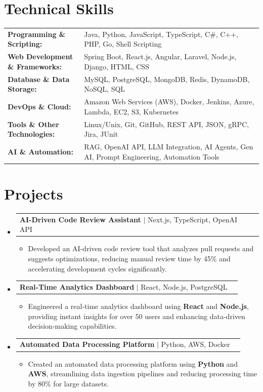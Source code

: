 \documentclass[letterpaper,10pt]{article}
\makeatletter
\newcommand{\resumeItem}[1]{
  \item{\fontsize{8pt}{9pt}\selectfont
    #1 \vspace{-3pt}
  }
}
\newcommand{\resumeProjectHeading}[2]{
    \item
    \begin{tabular*}{1.001\textwidth}{l@{\extracolsep{\fill}}r}
      \fontsize{8.5pt}{10pt}#1 & \textbf{\fontsize{8.5pt}{10pt} #2}\\
    \end{tabular*}\vspace{-7pt}
}
\newcommand{\resumeSubHeadingListStart}{\begin{itemize}[leftmargin=0pt, label={}]}
\newcommand{\resumeSubHeadingListEnd}{\end{itemize}}
\newcommand{\resumeItemListStart}{\begin{itemize}[leftmargin=*]}
\newcommand{\resumeItemListEnd}{\end{itemize}\vspace{-5pt}}
\makeatother
\begin{document}
\section{Technical Skills}
        \vspace{-14pt}
        \begin{table}[h]
            \fontsize{8pt}{9pt}\selectfont
            \begin{tabular}{p{0.3\linewidth} p{0.7\linewidth}}
                \textbf{Programming \& Scripting:} & Java, Python, JavaScript, TypeScript, C\#, C++, PHP, Go, Shell Scripting \\
                \textbf{Web Development \& Frameworks:} & Spring Boot, React.js, Angular, Laravel, Node.js, Django, HTML, CSS \\
                \textbf{Database \& Data Storage:} & MySQL, PostgreSQL, MongoDB, Redis, DynamoDB, NoSQL, SQL \\
                \textbf{DevOps \& Cloud:} & Amazon Web Services (AWS), Docker, Jenkins, Azure, Lambda, EC2, S3, Kubernetes \\
                \textbf{Tools \& Other Technologies:} & Linux/Unix, Git, GitHub, REST API, JSON, gRPC, Jira, JUnit \\
                \textbf{AI \& Automation:} & RAG, OpenAI API, LLM Integration, AI Agents, Gen AI, Prompt Engineering, Automation Tools \\
            \end{tabular}
        \end{table}
 \vspace{-18pt}

\section{Projects}
    \vspace{-5pt}
    \resumeSubHeadingListStart
          \resumeProjectHeading
            {\textbf{AI-Driven Code Review Assistant} $|$ Next.js, TypeScript, OpenAI API}{}
            \resumeItemListStart
                \resumeItem{Developed an AI-driven code review tool that analyzes pull requests and suggests optimizations, reducing manual review time by 45\% and accelerating development cycles significantly.}
            \resumeItemListEnd
        \vspace{-12pt}
    
        \resumeProjectHeading
            {\textbf{Real-Time Analytics Dashboard} $|$ React, Node.js, PostgreSQL}{}
        \resumeItemListStart
                \resumeItem{Engineered a real-time analytics dashboard using \textbf{React} and \textbf{Node.js}, providing instant insights for over 50 users and enhancing data-driven decision-making capabilities.}
        \resumeItemListEnd
      \vspace{-12pt}
      \resumeProjectHeading
        {\textbf{Automated Data Processing Platform} $|$ Python, AWS, Docker}{}
    \resumeItemListStart
            \resumeItem{Created an automated data processing platform using \textbf{Python} and \textbf{AWS}, streamlining data ingestion pipelines and reducing processing time by 80\% for large datasets.}
    \resumeItemListEnd
    \resumeSubHeadingListEnd
\end{document}
